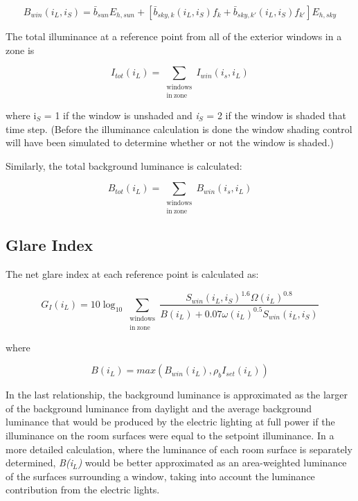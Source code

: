 \begin{equation}
{B_{win}}({i_L},{i_S}) = {\bar b_{sun}}{E_{h,sun}} + [{\bar b_{sky,k}}({i_L},{i_S}){f_k} + {\bar b_{sky,k'}}({i_L},{i_S}){f_{k'}}]{E_{h,sky}}
\end{equation}

The total illuminance at a reference point from all of the exterior windows in a zone is

\begin{equation}
  {I_{tot}}({i_L}) = \sum\limits_{\substack{\mathrm{windows}\\\mathrm{in~zone}}} {{I_{win}}({i_s},{i_L})}
\end{equation}

where i\(_{S}\) = 1 if the window is unshaded and \emph{i\(_{S}\)} = 2 if the window is shaded that time step. (Before the illuminance calculation is done the window shading control will have been simulated to determine whether or not the window is shaded.)

Similarly, the total background luminance is calculated:

\begin{equation}
  {B_{tot}}({i_L}) = \sum\limits_{\substack{\mathrm{windows}\\\mathrm{in~zone}}} {{B_{win}}({i_s},{i_L})}
\end{equation}

\subsection{Glare Index}\label{glare-index-000}

The net glare index at each reference point is calculated as:

\begin{equation}
  {G_I}({i_L}) = 10{\log_{10}}\sum\limits_{\substack{\mathrm{windows}\\\mathrm{in~zone}}} {\frac{{{S_{win}}{{({i_L},{i_S})}^{1.6}}\Omega {{({i_L})}^{0.8}}}}{{B({i_L}) + 0.07\omega {{({i_L})}^{0.5}}{S_{win}}({i_L},{i_S})}}}
\end{equation}

where

\begin{equation}
B\left( {{i_L}} \right) = max\left( {{B_{win}}\left( {{i_L}} \right),{\rho_b}{I_{set}}\left( {{i_L}} \right)} \right)
\end{equation}

In the last relationship, the background luminance is approximated as the larger of the background luminance from daylight and the average background luminance that would be produced by the electric lighting at full power if the illuminance on the room surfaces were equal to the setpoint illuminance. In a more detailed calculation, where the luminance of each room surface is separately determined, \emph{B(i\(_{L}\))} would be better approximated as an area-weighted luminance of the surfaces surrounding a window, taking into account the luminance contribution from the electric lights.

